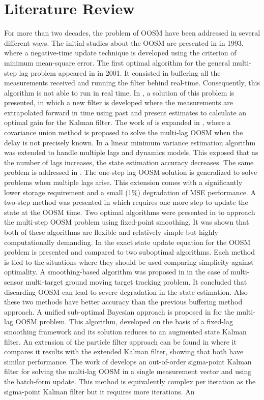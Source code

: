 \pagebreak
\section{Literature Review}
For more than two decades, the problem of OOSM have been addressed in several different ways. The initial studies about the OOSM are presented in \cite{Hilton1993} in 1993, where a negative-time update technique is developed using the criterion of minimum mean-square error. The first optimal algorithm for the general multi-step lag problem appeared in \cite{Nettleton2001} in 2001. It consisted in buffering all the measurements received and running the filter behind real-time. Consequently, this algorithm is not able to run in real time. In \cite{Larsen1998}, a solution of this problem is presented, in which a new filter is developed where the measurements are extrapolated forward in time using past and present estimates to calculate an optimal gain for the Kalman filter. The work of \cite{Larsen1998} is expanded in \cite{Julier2005}, where a covariance union method is proposed to solve the multi-lag OOSM when the delay is not precisely known. In \cite{Mallick2001} a linear minimum variance estimation algorithm was extended to handle multiple lags and dynamics models. This exposed that as the number of lags increases, the state estimation accuracy decreases. The same problem is addressed in \cite{Bar-Shalom2002a}. The one-step lag OOSM solution is generalized to solve problems when multiple lags arise. This extension comes with a significantly lower storage requirement and a small (1\%) degradation of MSE performance. A two-step method was presented in \cite{Lanzkron2004} which requires one more step to update the state at the OOSM time. Two optimal algorithms were presented in \cite{Zhang2002} to approach the multi-step OOSM problem using fixed-point smoothing. It was shown that both of these algorithms are flexible and relatively simple but highly computationally demanding. In \cite{Bar-Shalom2002} the exact state update equation for the OOSM problem is presented and compared to two suboptimal algorithms. Each method is tied to the situations where they should be used comparing simplicity against optimality. A smoothing-based algorithm was proposed in \cite{Mallick2002} in the case of multi-sensor multi-target ground moving target tracking problem. It concluded that discarding OOSM can lead to severe degradation in the state estimation. Also these two methods have better accuracy than the previous buffering method approach. A unified sub-optimal Bayesian approach is proposed in \cite{Challa2002} for the multi-lag OOSM problem. This algorithm, developed on the basis of a fixed-lag smoothing framework and its solution reduces to an augmented state Kalman filter. An extension of the particle filter approach can be found in \cite{Orton2005} where it compares it results with the extended Kalman filter, showing that both have similar performance. The work of \cite{Plett2007} develops an out-of-order sigma-point Kalman filter for solving the multi-lag OOSM in a single measurement vector and using the batch-form update. This method is equivalently complex per iteration as the sigma-point Kalman filter but it requires more iterations. An 